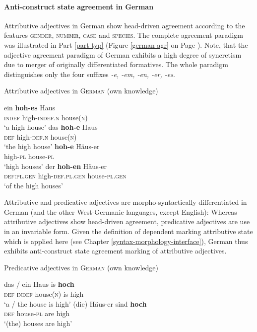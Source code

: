 \paragraph{Anti-construct state agreement in German}
Attributive adjectives in German show head-driven agreement according to the features \textsc{gender, number, case} and \textsc{species}. The complete agreement paradigm was illustrated in Part \ref{part typ} (Figure \ref{german agr} on Page \pageref{german agr}). Note, that the adjective agreement paradigm of German exhibits a high degree of syncretism due to merger of originally differentiated formatives. The whole paradigm distinguishes only the four suffixes \textit{-e, -em, -en, -er, -es}.
\begin{exe}
\ex Attributive adjectives in \textsc{German} (own knowledge)
\begin{xlist}
\ex
\gll	ein \textbf{hoh-es} Haus\\
	\textsc{indef} high-\textsc{indef.n} house(\textsc{n})\\
\glt	‘a high house’
\ex	
\gll	das \textbf{hoh-e} Haus\\
	\textsc{def} high-\textsc{def.n} house(\textsc{n})\\
\glt	‘the high house’
\ex	
\gll	\textbf{hoh-e} Häus-er\\
	high-\textsc{pl} house-\textsc{pl}\\
\glt	‘high houses’
\ex	
\gll	der \textbf{hoh-en} Häus-er\\
	\textsc{def:pl.gen} high-\textsc{def.pl.gen} house-\textsc{pl.gen}\\
\glt	‘of the high houses’
\end{xlist}
\end{exe}
Attributive and predicative adjectives are morpho-syntactically differentiated in German (and the other West-Germanic languages, except English):  Whereas attributive adjectives show head-driven agreement, predicative adjectives are use in an invariable form. Given the definition of dependent marking attributive state which is applied here (see Chapter \ref{syntax-morphology-interface}), German thus exhibits anti-construct state agreement marking of attributive adjectives.
\begin{exe}
\ex Predicative adjectives in \textsc{German} (own knowledge)
\begin{xlist}
\ex
\gll	das / ein Haus is \textbf{hoch}\\
	\textsc{def} {} \textsc{indef} house(\textsc{n}) is high\\
\glt	‘a / the house is high’
\ex	
\gll	(die) Häus-er sind \textbf{hoch}\\
	\textsc{def} house-\textsc{pl} are high\\
\glt	‘(the) houses are high’
\end{xlist}
\end{exe}

